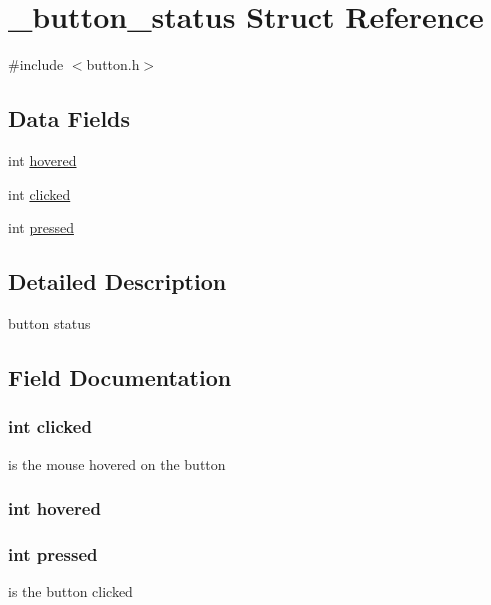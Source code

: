 \hypertarget{struct__button__status}{\section{\+\_\+button\+\_\+status Struct Reference}
\label{struct__button__status}
}


{\ttfamily \#include $<$button.\+h$>$}

\subsection*{Data Fields}
\begin{DoxyCompactItemize}
\item 
int \hyperlink{struct__button__status_a04d9c4c9b283d16ce102b1482fdff900}{hovered}
\item 
int \hyperlink{struct__button__status_aad83a4a92c010109563cfd522cf2aa8f}{clicked}
\item 
int \hyperlink{struct__button__status_a9a8271834e4fd4341e41a0e182d6cdff}{pressed}
\end{DoxyCompactItemize}


\subsection{Detailed Description}
button status 

\subsection{Field Documentation}
\hypertarget{struct__button__status_aad83a4a92c010109563cfd522cf2aa8f}{
\subsubsection[{clicked}]{\setlength{\rightskip}{0pt plus 5cm}int clicked}}\label{struct__button__status_aad83a4a92c010109563cfd522cf2aa8f}
is the mouse hovered on the button \hypertarget{struct__button__status_a04d9c4c9b283d16ce102b1482fdff900}{
\subsubsection[{hovered}]{\setlength{\rightskip}{0pt plus 5cm}int hovered}}\label{struct__button__status_a04d9c4c9b283d16ce102b1482fdff900}
\hypertarget{struct__button__status_a9a8271834e4fd4341e41a0e182d6cdff}{
\subsubsection[{pressed}]{\setlength{\rightskip}{0pt plus 5cm}int pressed}}\label{struct__button__status_a9a8271834e4fd4341e41a0e182d6cdff}
is the button clicked 

